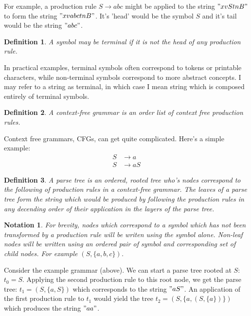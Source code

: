 \documentclass[11pt]{article}
\newtheorem{definition}{Definition}
\newtheorem{notation}{Notation}
\begin{document}
For example, a production rule $S \rightarrow a b c$ might be applied to the 
string $"x v S t n B"$ to form the string $"x v a b c t n B"$. It's 'head' would
be the symbol $S$ and it's tail would be the string $"a b c"$.

\begin{definition}
A symbol may be {\em terminal} if it is not the head of any production rule.
\end{definition}

In practical examples, terminal symbols often correspond to tokens or printable characters, 
while non-terminal symbols correspond to more abstract concepts. I may refer to a string
as terminal, in which case I mean string which is composed entirely of terminal symbols.

\begin{definition}
A \em{context-free grammar} is an order list of context free production rules.
\end{definition}

Context free grammars, CFGs, can get quite complicated. Here's a simple example:
\begin{align}
S &\rightarrow a\\
S &\rightarrow a S
\end{align}
\setcounter{equation}{0}

\begin{definition}
A {\em parse tree} is an ordered, rooted tree who's nodes correspond to the
following of production rules in a context-free grammar. The leaves of a
parse tree form the string which would be produced by following the
production rules in any decending order of their application in the layers of the
parse tree.
\end{definition}

\begin{notation}
For brevity, nodes which correspond to a symbol which has not been transformed
by a production rule will be writen using the symbol alone. Non-leaf nodes will
be written using an ordered pair of symbol and corresponding set of child
nodes. For example $(S, \{a, b, c\})$.
\end{notation}

Consider the example grammar (above). We can start a parse tree rooted at $S$:
$t_0 = S$. Applying the second production rule to this root node, we get the parse tree:
$t_1 = (S, \{a, S\})$ which corresponds to the string $"a S"$.
An application of the first production rule to $t_1$ would yield the tree 
$t_2 = (S, \{a, (S, \{a\})\})$ which produces the string $"a a"$. 
\end{document}
